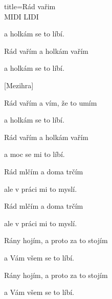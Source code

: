 \begin{song}{title=\centering Rád vařim \\\normalsize MIDI LIDI \vspace*{-0.3cm}}
{\begin{minipage}[t]{0.48\textwidth}
a holkám se to líbí.

\phantom{.}

Rád vařím a holkám vařím 

a holkám se to líbí.

\phantom{.}

[Mezihra]

\end{minipage}\begin{minipage}[t]{0.48\textwidth}\setlength{\parindent}{0.45cm}\vspace*{0.55cm}  %

\sloka
Rád vařím a vím, že to umím

a holkám se to líbí.

\phantom{.}

Rád vařím a holkám vařím 

a moc se mi to líbí.

\phantom{.}

Rád mlčím a doma trčím 

ale v práci mi to myslí.

\phantom{.}

Rád mlčím a doma trčím 

ale v práci mi to myslí.

\phantom{.}

Rány hojím, a proto za to stojím

a Vám všem se to líbí.

\phantom{.}

Rány hojím, a proto za to stojím 

a Vám všem se to líbí.

\end{minipage}
}
\setcounter{Slokočet}{0}
\end{song}
